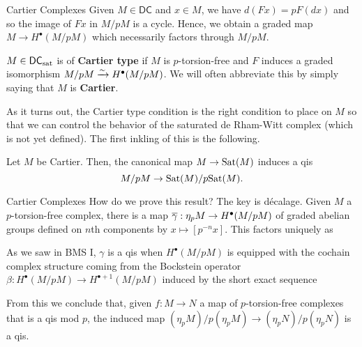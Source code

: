 \documentclass[aspectratio=1610]{beamer}
\newcommand{\DC}{\mathsf{DC}}
\newcommand{\sat}{\textup{sat}}
\newcommand{\Sat}{\textup{Sat}}
\begin{document}
\begin{frame}{Cartier Complexes}
Given $M\in\DC$ and $x\in M$, we have $d(Fx)=pF(dx)$ and so the image of $Fx$ in $M/pM$ is a cycle. Hence, we obtain a graded map $M\to H^{\bullet}(M/pM)$ which necessarily factors through $M/pM$.

\begin{definition}
$M\in\DC_{\sat}$ is of \textbf{Cartier type} if $M$ is $p$-torsion-free and $F$ induces a graded isomorphism $M/pM\xrightarrow{\sim}H^{\bullet}(M/pM)$. We will often abbreviate this by simply saying that $M$ is \textbf{Cartier}.
\end{definition}

As it turns out, the Cartier type condition is the right condition to place on $M$ so that we can control the behavior of the saturated de Rham-Witt complex (which is not yet defined). The first inkling of this is the following.

\begin{theorem}
Let $M$ be Cartier. Then, the canonical map $M\to\Sat(M)$ induces a qis 
$$M/pM\to\Sat(M)/p\Sat(M).$$
\end{theorem}
\end{frame}

\begin{frame}[fragile]{Cartier Complexes}
How do we prove this result? The key is d\'{e}calage. Given $M$ a $p$-torsion-free complex, there is a map $\overline{\gamma}: \eta_pM\to H^{\bullet}(M/pM)$ of graded abelian groups defined on $n$th components by $x\mapsto[p^{-n}x]$. This factors uniquely as 
\begin{center}
\end{center}
As we saw in BMS I, $\gamma$ is a qis when $H^{\bullet}(M/pM)$ is equipped with the cochain complex structure coming from the Bockstein operator $\beta: H^{\bullet}(M/pM)\to H^{\bullet+1}(M/pM)$ induced by the short exact sequence
\begin{center}
\end{center}
From this we conclude that, given $f: M\to N$ a map of $p$-torsion-free complexes that is a qis mod $p$, the induced map $(\eta_pM)/p(\eta_pM)\to(\eta_pN)/p(\eta_pN)$ is a qis. 
\end{frame}
\end{document}
